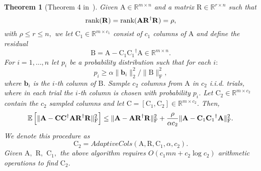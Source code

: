 \documentclass[11pt]{article}
\newcommand{\Expect}[1]{\mbox{}{\mathbb{E}}\left[#1\right]}
\newcommand{\FNormS}[1]{\mbox{}\|#1\|_\mathrm{F}^2}
\newcommand{\TNormS}[1]{\mbox{}\|#1\|_2^2}
\newcommand{\pinv}[1]{ {#1}^\dagger}
\newtheorem{theorem}{Theorem}
\newcommand{\mat}[1]{{\ensuremath{\bm{\mathrm{#1}}}}}
\def\rank{\hbox{\rm rank}}
\def\b{{\mathbf b}}
\def\matA{\mat{A}}
\def\matB{\mat{B}}
\def\matC{\mat{C}}
\def\matR{\mat{R}}
\def\math#1{$#1$}
\def\frac#1#2{{#1\over #2}}
\def\b{{\mathbf b}}
\begin{document}
\begin{theorem}[Theorem 4 in~\cite{WZ13CUR}]
\label{thm:adaptiverows}
Given $\matA \in \mathbb{R}^{m \times n}$ and a matrix $\matR \in \mathbb{R}^{r \times n}$ such that 
$$\rank(\matR) = \rank(\matA \pinv{\matR} \matR) = \rho,$$
with $\rho \le r \le n,$
we let $\matC_1 \in \mathbb{R}^{m \times c_1}$ consist of $c_1$ columns of $\matA$ 
and define the residual 
$$\matB = \matA - \matC_1 \pinv{\matC_1} \matA \in \mathbb{R}^{m \times n}.$$
For $i=1,\ldots,n$ let $p_i$ be a probability distribution such that for each $i:$
$$p_i \geq \alpha {\TNormS{\b_{i}}}/{\FNormS{\matB}},$$
where $\b_i$ is the $i$-th column of $\matB$. Sample
$c_2$ columns from $\matA$ in \math{c_2} i.i.d. trials, 
where in each trial the $i$-th column is chosen with probability $p_i$.
Let $\matC_2 \in \mathbb{R}^{m \times c_2}$ 
contain the $c_2$ sampled columns and let $\matC = [\matC_1 , \matC_2] \in \mathbb{R}^{m \times c_2}$.
Then,
$$\Expect{ \FNormS{ \matA - \matC\pinv{\matC}\matA \pinv{\matR}\matR } }
\le \FNormS{\matA - \matA \pinv{\matR}\matR } + \frac{\rho}{\alpha c_2} \FNormS{\matA - \matC_1 \pinv{\matC_1} \matA}.$$
We denote this procedure as
$$\matC_2 = AdaptiveCols(\matA, \matR, \matC_1, \alpha, c_2).$$
Given $\matA,$ $\matR,$ $\matC_1,$
the above algorithm requires $O( c_1 m n + c_2 \log c_2  )$ arithmetic operations to find $\matC_2$.
\end{theorem}
\end{document}
